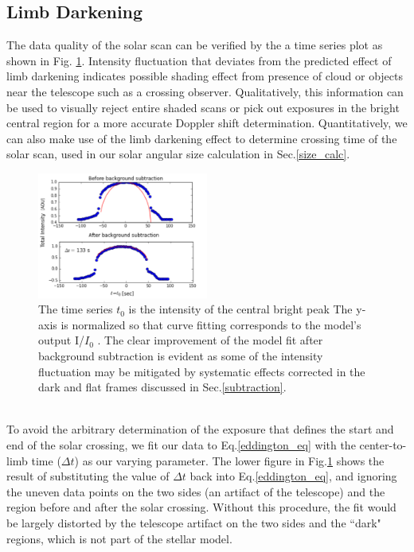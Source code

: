 \documentclass[authoryear, 12pt,5p, times]{elsarticle}
\begin{document}
\subsection{Limb Darkening}
The data quality of the solar scan can be verified by the a time series plot as shown in Fig. \ref{eddington_fit}. Intensity fluctuation that deviates from the predicted effect of limb darkening indicates possible shading effect from presence of cloud or objects near the telescope such as a crossing observer. Qualitatively, this information can be used to visually reject entire shaded scans or pick out exposures in the bright central region for a more accurate Doppler shift determination. Quantitatively, we can also make use of the limb darkening effect to determine crossing time of the solar scan, used in our solar angular size calculation in Sec.\ref{size_calc}.
\\
\begin{figure}[h!]
\includegraphics[width=0.5\textwidth]{figures/eddington_fit}
\caption{ The time series 
$t_0$ is the intensity of the central bright peak
The y-axis is normalized so that curve fitting corresponds to the model's output I/$I_0$ . The clear improvement of the model fit after background subtraction is evident as some of the intensity fluctuation may be mitigated by systematic effects corrected in the dark and flat frames discussed in Sec.\ref{subtraction}. }
\label{eddington_fit}
\end{figure}
\\
To avoid the arbitrary determination of the exposure that defines the start and end of the solar crossing, we fit our data to Eq.\ref{eddington_eq} with the center-to-limb time ($\Delta t$) as our varying parameter.  The lower figure in Fig.\ref{eddington_fit} shows the result of substituting the value of $\Delta t$ back into Eq.\ref{eddington_eq}, and ignoring the uneven data points on the two sides  (an artifact of the telescope) and the region before and after the solar crossing. Without this procedure, the fit would be largely distorted by the telescope artifact on the two sides and the ``dark" regions, which is not part of the stellar model. 
\end{document}
